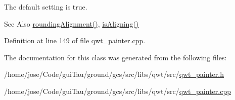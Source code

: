 The default setting is true.

\begin{DoxySeeAlso}{See Also}
\hyperlink{class_qwt_painter_ae9af230df7bb8d40b802d4f3205a8631}{rounding\-Alignment()}, \hyperlink{class_qwt_painter_a5d62fd1bd470fa0d42b7b2e06504a581}{is\-Aligning()} 
\end{DoxySeeAlso}


Definition at line 149 of file qwt\-\_\-painter.\-cpp.



The documentation for this class was generated from the following files\-:\begin{DoxyCompactItemize}
\item 
/home/jose/\-Code/gui\-Tau/ground/gcs/src/libs/qwt/src/\hyperlink{qwt__painter_8h}{qwt\-\_\-painter.\-h}\item 
/home/jose/\-Code/gui\-Tau/ground/gcs/src/libs/qwt/src/\hyperlink{qwt__painter_8cpp}{qwt\-\_\-painter.\-cpp}\end{DoxyCompactItemize}
